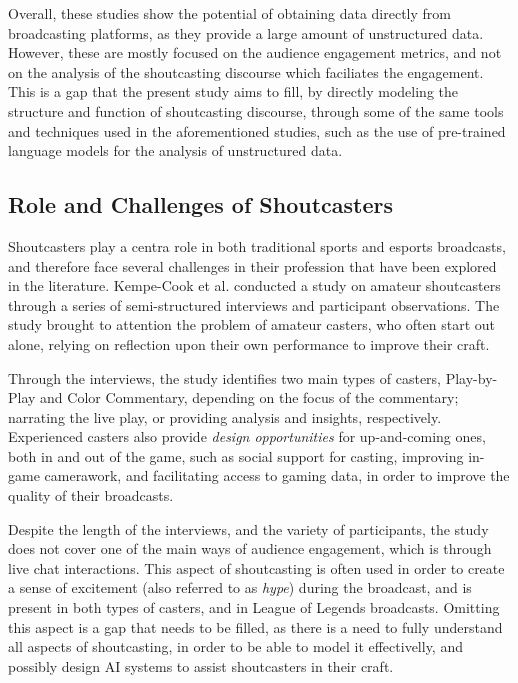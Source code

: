 Overall, these studies show the potential of obtaining data directly from broadcasting platforms, as they provide a large amount of unstructured data. However, these are mostly focused on the audience engagement metrics, and not on the analysis of the shoutcasting discourse which faciliates the engagement. This is a gap that the present study aims to fill, by directly modeling the structure and function of shoutcasting discourse, through some of the same tools and techniques used in the aforementioned studies, such as the use of pre-trained language models for the analysis of unstructured data.

\subsection{Role and Challenges of Shoutcasters}
\label{subsec:role-and-challenges-of-shoutcasters}

Shoutcasters play a centra role in both traditional sports and esports broadcasts, and therefore face several challenges in their profession that have been explored in the literature. Kempe-Cook et al. \cite{kempe2019Behind} conducted a study on amateur shoutcasters through a series of semi-structured interviews and participant observations. The study brought to attention the problem of amateur casters, who often start out alone, relying on reflection upon their own performance to improve their craft. 

\medskip 

Through the interviews, the study identifies two main types of casters, Play-by-Play and Color Commentary, depending on the focus of the commentary; narrating the live play, or providing analysis and insights, respectively. Experienced casters also provide \textit{design opportunities} for up-and-coming ones, both in and out of the game, such as social support for casting, improving in-game camerawork, and facilitating access to gaming data, in order to improve the quality of their broadcasts.

\medskip

Despite the length of the interviews, and the variety of participants, the study does not cover one of the main ways of audience engagement, which is through live chat interactions. This aspect of shoutcasting is often used in order to create a sense of excitement (also referred to as \textit{hype}) during the broadcast, and is present in both types of casters, and in League of Legends broadcasts. Omitting this aspect is a gap that needs to be filled, as there is a need to fully understand all aspects of shoutcasting, in order to be able to model it effectivelly, and possibly design AI systems to assist shoutcasters in their craft.

